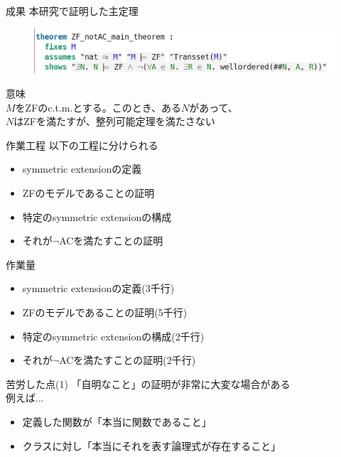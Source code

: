 \documentclass[17pt,aspectratio=169]{beamer}
\begin{document}
\begin{frame}{成果}
    本研究で証明した主定理
    \vspace{-1cm}
    \hspace{-1.5cm}
    \begin{figure}
        \includegraphics[width=1.1\linewidth]{./images/ZF_notAC_main_theorem.png}
    \end{figure}

    \vspace{-5pt}
    意味 \\
    {\small
    \hspace{1cm} $M$をZFのc.t.m.とする。このとき、ある$N$があって、\\
    \hspace{1cm} $N$はZFを満たすが、整列可能定理を満たさない
    }
\end{frame}

\begin{frame}{作業工程}
    以下の工程に分けられる
    \begin{itemize}[itemsep=8pt]
        \item symmetric extensionの定義
        \item ZFのモデルであることの証明
        \item 特定のsymmetric extensionの構成
        \item それが$\neg$ACを満たすことの証明
    \end{itemize}
\end{frame}

\begin{frame}{作業量}
    {\small
        \begin{itemize}[itemsep=8pt]
            \item symmetric extensionの定義(3千行)
            \item ZFのモデルであることの証明(5千行)
            \item 特定のsymmetric extensionの構成(2千行)
            \item それが$\neg$ACを満たすことの証明(2千行)
        \end{itemize} } 
\end{frame}

\begin{frame}{苦労した点(1)}
    「自明なこと」の証明が非常に大変な場合がある \\
    例えば...
    {\small
    \begin{itemize}
        \item 定義した関数が「本当に関数であること」
        \item クラスに対し「本当にそれを表す論理式が存在すること」
    \end{itemize}
    }
\end{frame}
\end{document}
